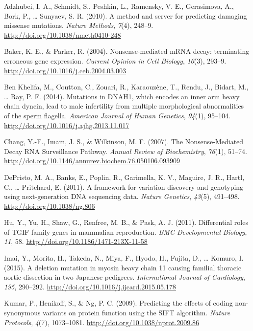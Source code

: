 \documentclass[12pt,twoside]{reedthesis}
\theoremstyle{definition}
\theoremstyle{definition}
\theoremstyle{remark}
\begin{document}
  \hypertarget{refs}{}
  \hypertarget{ref-Adzhubei2010}{}
  Adzhubei, I. A., Schmidt, S., Peshkin, L., Ramensky, V. E., Gerasimova,
  A., Bork, P., \ldots{} Sunyaev, S. R. (2010). A method and server for
  predicting damaging missense mutations. \emph{Nature Methods},
  \emph{7}(4), 248--9. \url{http://doi.org/10.1038/nmeth0410-248}
  
  \hypertarget{ref-Baker2004}{}
  Baker, K. E., \& Parker, R. (2004). Nonsense-mediated mRNA decay:
  terminating erroneous gene expression. \emph{Current Opinion in Cell
  Biology}, \emph{16}(3), 293--9.
  \url{http://doi.org/10.1016/j.ceb.2004.03.003}
  
  \hypertarget{ref-BenKhelifa2014}{}
  Ben Khelifa, M., Coutton, C., Zouari, R., Karaouzène, T., Rendu, J.,
  Bidart, M., \ldots{} Ray, P. F. (2014). Mutations in DNAH1, which
  encodes an inner arm heavy chain dynein, lead to male infertility from
  multiple morphological abnormalities of the sperm flagella.
  \emph{American Journal of Human Genetics}, \emph{94}(1), 95--104.
  \url{http://doi.org/10.1016/j.ajhg.2013.11.017}
  
  \hypertarget{ref-Chang2007}{}
  Chang, Y.-F., Imam, J. S., \& Wilkinson, M. F. (2007). The
  Nonsense-Mediated Decay RNA Surveillance Pathway. \emph{Annual Review of
  Biochemistry}, \emph{76}(1), 51--74.
  \url{http://doi.org/10.1146/annurev.biochem.76.050106.093909}
  
  \hypertarget{ref-DePristo2011}{}
  DePristo, M. A., Banks, E., Poplin, R., Garimella, K. V., Maguire, J.
  R., Hartl, C., \ldots{} Pritchard, E. (2011). A framework for variation
  discovery and genotyping using next-generation DNA sequencing data.
  \emph{Nature Genetics}, \emph{43}(5), 491--498.
  \url{http://doi.org/10.1038/ng.806}
  
  \hypertarget{ref-Hu2011}{}
  Hu, Y., Yu, H., Shaw, G., Renfree, M. B., \& Pask, A. J. (2011).
  Differential roles of TGIF family genes in mammalian reproduction.
  \emph{BMC Developmental Biology}, \emph{11}, 58.
  \url{http://doi.org/10.1186/1471-213X-11-58}
  
  \hypertarget{ref-Imai2015}{}
  Imai, Y., Morita, H., Takeda, N., Miya, F., Hyodo, H., Fujita, D.,
  \ldots{} Komuro, I. (2015). A deletion mutation in myosin heavy chain 11
  causing familial thoracic aortic dissection in two Japanese pedigrees.
  \emph{International Journal of Cardiology}, \emph{195}, 290--292.
  \url{http://doi.org/10.1016/j.ijcard.2015.05.178}
  
  \hypertarget{ref-Kumar2009}{}
  Kumar, P., Henikoff, S., \& Ng, P. C. (2009). Predicting the effects of
  coding non-synonymous variants on protein function using the SIFT
  algorithm. \emph{Nature Protocols}, \emph{4}(7), 1073--1081.
  \url{http://doi.org/10.1038/nprot.2009.86}
  
\end{document}
